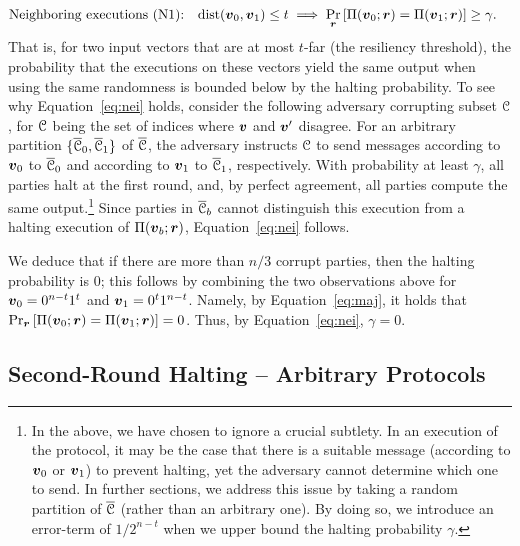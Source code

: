 \begin{align}\label{eq:nei}
&\text{Neighboring executions (N1):} \quad \mathrm{dist}({ \boldsymbol{v}}_0,{ \boldsymbol{v}}_1)\le t \implies \Pr_{{ \boldsymbol{r}}}\left[\Pi({ \boldsymbol{v}}_0;{ \boldsymbol{r}})=\Pi({ \boldsymbol{v}}_1;{ \boldsymbol{r}})\right]\ge \gamma.
\end{align}
That is, for two input vectors that are at most $t$-far (\ie the resiliency threshold), the probability that the executions on these vectors yield the same output when using the same randomness is bounded below by the halting probability. To see why Equation~\ref{eq:nei} holds, consider the following adversary corrupting subset $\mathcal{C}$, for $\mathcal{C}$ being the set of indices where ${ \boldsymbol{v}}$ and ${ \boldsymbol{v}}'$ disagree. For an arbitrary partition $\{\overline{\mathcal{C}}_0,\overline{\mathcal{C}}_1\}$ of $\overline{\mathcal{C}}$, the adversary instructs $\mathcal{C}$ to send messages according to ${ \boldsymbol{v}}_0$ to $\overline{\mathcal{C}}_0$ and according to ${ \boldsymbol{v}}_1$ to $\overline{\mathcal{C}}_1$, respectively. With probability at least $\gamma$, all parties halt at the first round, and, by perfect agreement, all parties compute the same output.\footnote{In the above, we have chosen to ignore a crucial subtlety. In an execution of the protocol, it may be the case that there is a suitable message (according to ${ \boldsymbol{v}}_0$ or ${ \boldsymbol{v}}_1$) to prevent halting, yet the adversary cannot determine which one to send. In further sections, we address this issue by taking a random partition of $\overline{\mathcal{C}}$ (rather than an arbitrary one). By doing so, we introduce an error-term of $1/2^{n-t}$ when we upper bound the halting probability $\gamma$.} Since parties in $\overline{\mathcal{C}}_b$ cannot distinguish this execution from a halting execution of $\Pi({ \boldsymbol{v}}_b;{ \boldsymbol{r}})$, Equation~\ref{eq:nei} follows.


We deduce that if there are more than $n/3$ corrupt parties, then the halting probability is $0$; this follows by combining the two observations above for ${ \boldsymbol{v}}_0=0^{n-t}1^{t}$ and ${ \boldsymbol{v}}_1=0^{t}1^{n-t}$. Namely, by Equation~\ref{eq:maj}, it holds that $\Pr_{{ \boldsymbol{r}}}\left[\Pi({ \boldsymbol{v}}_0;{ \boldsymbol{r}})=\Pi({ \boldsymbol{v}}_1;{ \boldsymbol{r}})\right]=0$. Thus, by Equation~\ref{eq:nei}, $\gamma=0$.

\subsection{Second-Round Halting -- Arbitrary Protocols}\label{sec:technique:2}

